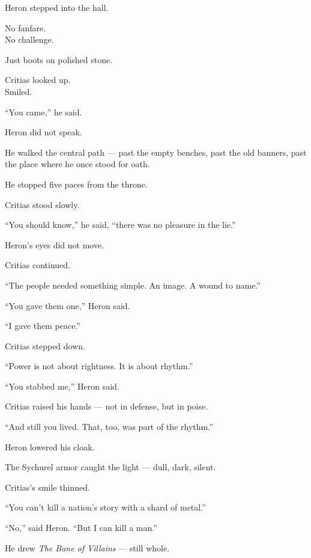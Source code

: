 \documentclass[9pt]{article}
\begin{document}
\vspace{1em}

Heron stepped into the hall.

No fanfare.\\
No challenge.

Just boots on polished stone.

Critias looked up.\\
Smiled.

“You came,” he said.

\vspace{1em}

Heron did not speak.

He walked the central path — past the empty benches, past the old banners, past the place where he once stood for oath.

He stopped five paces from the throne.

\vspace{1em}

Critias stood slowly.

“You should know,” he said, “there was no pleasure in the lie.”

Heron’s eyes did not move.

Critias continued.

“The people needed something simple. An image. A wound to name.”

“You gave them one,” Heron said.

“I gave them peace.”

\vspace{1em}

Critias stepped down.

“Power is not about rightness. It is about rhythm.”

“You stabbed me,” Heron said.

Critias raised his hands — not in defense, but in poise.

“And still you lived. That, too, was part of the rhythm.”

\vspace{1em}

Heron lowered his cloak.

The Sychurel armor caught the light — dull, dark, silent.

Critias’s smile thinned.

“You can’t kill a nation’s story with a shard of metal.”

“No,” said Heron. “But I can kill a man.”

He drew \textit{The Bane of Villains} — still whole.
\end{document}
